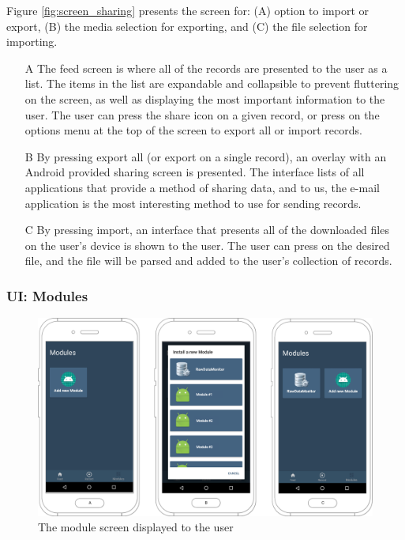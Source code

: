 Figure \ref{fig:screen_sharing} presents the screen for: (A) option to import or export, (B) the media selection for exporting, and (C) the file selection for importing.

\begin{itemize}
    \item[A] The feed screen is where all of the records are presented to the user as a list. The items in the list are expandable and collapsible to prevent fluttering on the screen, as well as displaying the most important information to the user. The user can press the share icon on a given record, or press on the options menu at the top of the screen to export all or import records.
    \item[B] By pressing export all (or export on a single record), an overlay with an Android provided sharing screen is presented. The interface lists of all applications that provide a method of sharing data, and to us, the e-mail application is the most interesting method to use for sending records. 
    \item[C] By pressing import, an interface that presents all of the downloaded files on the user's device is shown to the user. The user can press on the desired file, and the file will be parsed and added to the user's collection of records.  
\end{itemize}

\subsubsection{UI: Modules}
\begin{figure}[!h]
    \centering
    \includegraphics[scale=0.26]{images/Modules_img.pdf}
    \caption{The module screen displayed to the user}
    \label{fig:screen_modules}
\end{figure}

